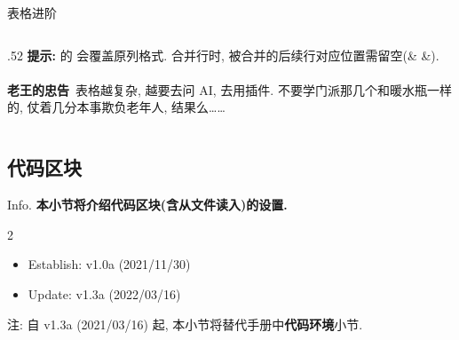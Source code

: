 \begin{frame}{表格进阶}
\begin{columns}[T, onlytextwidth]
\begin{column}{.52\textwidth}
			\textbf{提示:}  的  会覆盖原列格式.  合并行时, 被合并的后续行对应位置需留空(\& \&).\\~\\

			\textbf{老王的忠告}~表格越复杂, 越要去问 AI, 去用插件. 不要学门派那几个和暖水瓶一样的, 仗着几分本事欺负老年人, 结果么\ldots\ldots
		\end{column}
	\end{columns}
\end{frame}

\subsection{代码区块}
\begin{frame}{Info.}
	\textbf{本小节将介绍代码区块(含从文件读入)的设置.}
	\begin{multicols}{2}
		\begin{itemize}
			\item Establish: \textcolor{scugreen}{v1.0a (2021/11/30)}
			\item Update: \textcolor{scugreen}{v1.3a (2022/03/16)}
		\end{itemize}
	\end{multicols}
	注: 自 \textcolor{scugreen}{v1.3a (2021/03/16)} 起, 本小节将替代手册中\alert{\bfseries 代码环境}小节.\par
	\mycopyright
\end{frame}

